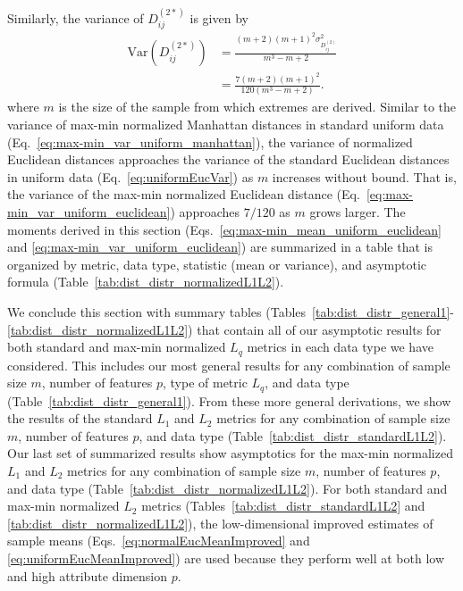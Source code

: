 \documentclass[aoas]{imsart}
\begin{document}
Similarly, the variance of $D^{(2*)}_{ij}$ is given by
%
\begin{equation}\label{eq:max-min_var_uniform_euclidean}
\begin{aligned}
\text{Var}\left(D^{(2*)}_{ij}\right) &= \frac{(m+2)(m+1)^2\sigma^2_{D^{(2)}_{ij}}}{m^3 - m + 2} \\
&= \frac{7(m+2)(m+1)^2}{120(m^3 - m + 2)}.
\end{aligned}
\end{equation}
%
where $m$ is the size of the sample from which extremes are derived. Similar to the variance of max-min normalized Manhattan distances in standard uniform data (Eq.~\ref{eq:max-min_var_uniform_manhattan}), the variance of normalized Euclidean distances approaches the variance of the standard Euclidean distances in uniform data (Eq.~\ref{eq:uniformEucVar}) as $m$ increases without bound. That is, the variance of the max-min normalized Euclidean distance (Eq.~\ref{eq:max-min_var_uniform_euclidean}) approaches $7/120$ as $m$ grows larger. The moments derived in this section (Eqs.~\ref{eq:max-min_mean_uniform_euclidean} and \ref{eq:max-min_var_uniform_euclidean}) are summarized in a table that is organized by metric, data type, statistic (mean or variance), and asymptotic formula (Table~\ref{tab:dist_distr_normalizedL1L2}).

We conclude this section with summary tables (Tables~\ref{tab:dist_distr_general1}-\ref{tab:dist_distr_normalizedL1L2}) that contain all of our asymptotic results for both standard and max-min normalized $L_q$ metrics in each data type we have considered. This includes our most general results for any combination of sample size $m$, number of features $p$, type of metric $L_q$, and data type (Table~\ref{tab:dist_distr_general1}). From these more general derivations, we show the results of the standard $L_1$ and $L_2$ metrics for any combination of sample size $m$, number of features $p$, and data type (Table~\ref{tab:dist_distr_standardL1L2}). Our last set of summarized results show asymptotics for the max-min normalized $L_1$ and $L_2$ metrics for any combination of sample size $m$, number of features $p$, and data type (Table~\ref{tab:dist_distr_normalizedL1L2}). For both standard and max-min normalized $L_2$ metrics (Tables~\ref{tab:dist_distr_standardL1L2} and \ref{tab:dist_distr_normalizedL1L2}), the low-dimensional improved estimates of sample means (Eqs.~\ref{eq:normalEucMeanImproved} and \ref{eq:uniformEucMeanImproved}) are used because they perform well at both low and high attribute dimension $p$.
\end{document}
